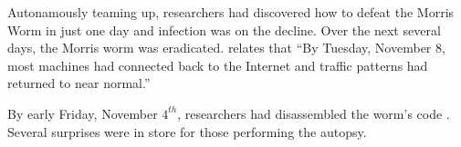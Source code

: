 Autonamously teaming up, researchers had discovered how to defeat the Morris
Worm in just one day and infection was on the decline. Over the next several
days, the Morris worm was eradicated. \cite{spafford_internet_1989-1} relates
that ``By Tuesday, November 8, most machines had connected back to the Internet
and traffic patterns had returned to near normal.''

By early Friday, November $4^{th}$, researchers had disassembled the worm's
code 
\cite{spafford_crisis_1989}
\cite{seeley_tour_1989}.
Several surprises were in store for those performing the autopsy.